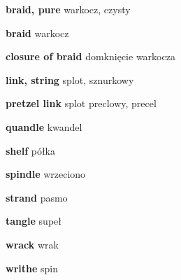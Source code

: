 \item \textbf{braid, pure} warkocz, czysty
\item \textbf{braid} warkocz
\item \textbf{closure of braid} domknięcie warkocza
\item \textbf{link, string} splot, sznurkowy
\item \textbf{pretzel link} splot preclowy, precel
\item \textbf{quandle} kwandel
\item \textbf{shelf} półka
\item \textbf{spindle} wrzeciono
\item \textbf{strand} pasmo
\item \textbf{tangle} supeł
\item \textbf{wrack} wrak
\item \textbf{writhe} spin
